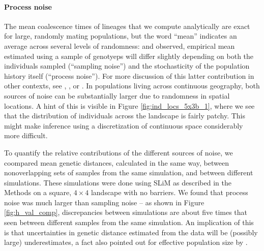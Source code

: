 \documentclass{article}
\begin{document}
\paragraph{Process noise}
The mean coalescence times of lineages that we compute analytically
are exact for large, randomly mating populations,
but the word ``mean'' indicates an average across several levels of randomness:
and observed, empirical mean estimated using a sample of genotyeps
will differ slightly depending on both the individuals sampled (``sampling noise'')
and the stochasticity of the population history itself (``process noise'').
For more discussion of this latter contribution in other contexts, see
\citet{waples}, \citet{wakeley}, or \citet{ralph_empirical}.
In populations living across continuous geography,
both sources of noise can be substantially larger due to randomness in spatial locations.
A hint of this is visible in Figure \ref{fig:ind_locs_5x3b_1},
where we see that the distribution of individuals across the landscape
is fairly patchy.
This might make inference using a discretization of continuous space considerably more difficult.

To quantify the relative contributions of the different sources of noise,
we coompared mean genetic distances, calculated in the same way,
between nonoverlapping sets of samples from the same simulation,
and between different simulations.
These simulations were done using SLiM as described in the Methods
on a square, $4 \times 4$ landscape with no barriers.
We found that process noise was much larger than sampling noise --
as shown in Figure \ref{fig:h_val_comp},
discrepancies between simulations are about five times that seen
between different samples from the same simulation.
An implication of this is that uncertainties in genetic distance
estimated from the data will be (possibly large) underestimates,
a fact also pointed out for effective population size by \citet{waples}.
\end{document}
